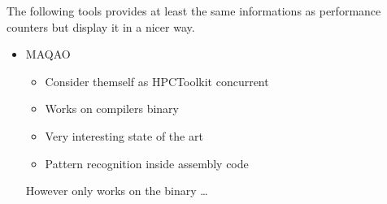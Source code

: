 The following tools provides at least the same informations as performance
counters but display it in a nicer way.
\begin{itemize}
    \item MAQAO \cite{Djoudi05MAQAO}
        \begin{itemize}
            \item Consider themself as HPCToolkit concurrent
            \item Works on compilers binary
            \item Very interesting state of the art
            \item Pattern recognition inside assembly code
        \end{itemize}
        However only works on the binary \dots

\end{itemize}
